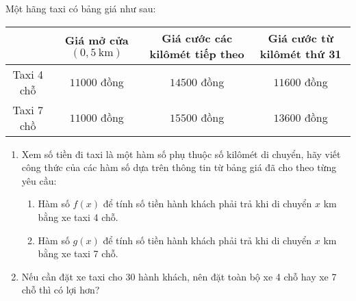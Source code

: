 \begin{ex}%
Một hãng taxi có bảng giá như sau:
\begin{center}
\begin{tabular}{|c|c|c|c|}
    \hline & Giá mở cửa $(0{,}5 \mathrm{~km})$ & Giá cước các kilômét tiếp theo & Giá cước từ kilômét thứ 31 \\
    \hline Taxi 4 chỗ & $11000$ đồng & $14500$ đồng & $11600$ đồng \\
    \hline Taxi 7 chồ & $11000$ đồng & $15500$ đồng & $13600$ đồng \\
    \hline
\end{tabular}
\end{center}
\begin{enumerate}
\item Xem số tiền đi taxi là một hàm số phụ thuộc số kilômét di chuyển, hãy viết công thức của các hàm số dựa trên thông tin từ bảng giá đã cho theo từng yêu cầu:\begin{enumerate}
\item Hàm số $f(x)$ để tính số tiền hành khách phải trả khi di chuyển $x$ km bằng xe taxi 4 chỗ.
\item Hàm số $g(x)$ để tính số tiền hành khách phải trả khi di chuyển $x$ km bằng xe taxi 7 chỗ.
\end{enumerate}
\item Nếu cần đặt xe taxi cho $30$ hành khách, nên đặt toàn bộ xe 4 chỗ hay xe 7 chỗ thì có lợi hơn?
\end{enumerate}
\end{ex}
